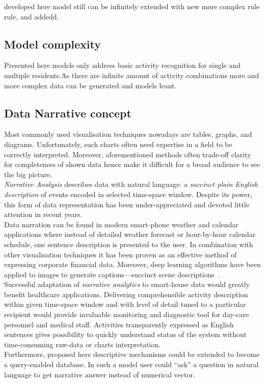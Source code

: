 \documentclass[12pt, a4paper, pdflatex, leqno, twoside, openright]{report}
\begin{document}
developed here model still can be infinitely extended with new more complex rule rule, and addedd.

    \subsection{Model complexity}
Presented here models only address basic activity recognition for single and multiple residents.As there are infinite amount of activity combinations more and more complex data can be generated and models leant.\\

    \subsection{Data Narrative concept\label{sec:narrative}}
Most commonly used visualisation techniques nowadays are tables, graphs, and diagrams. Unfortunately, such charts often need expertise in a field to be correctly interpreted. Moreover, aforementioned methods often trade-off clarity for completeness of shown data hence make it difficult for a broad audience to see the big picture.\\

\emph{Narrative Analysis} describes data with natural language: a \emph{succinct plain English description} of events encoded in selected time-space window. Despite its power, this form of data representation has been under-appreciated and devoted little attention in recent years.\\
Data narration can be found in modern smart-phone weather and calendar applications where instead of detailed weather forecast or hour-by-hour calendar schedule, one sentence description is presented to the user. In combination with other visualisation techniques it has been proven as an effective method of expressing corporate financial data. Moreover, deep learning algorithms have been applied to images to generate captions---succinct scene descriptions~\citep{vinyals2014show}.\\

Successful adaptation of \emph{narrative analytics} to smart-house data would greatly benefit healthcare applications. Delivering comprehensible activity description within given time-space window and with level of detail tuned to a particular recipient would provide invaluable monitoring and diagnostic tool for day-care personnel and medical staff. Activities transparently expressed as English sentences gives possibility to quickly understand status of the system without time-consuming raw-data or charts interpretation.\\
Furthermore, proposed here descriptive mechanisms could be extended to become a query-enabled database. In such a model user could ``ask'' a question in natural language to get narrative answer instead of numerical vector.\\
\end{document}
